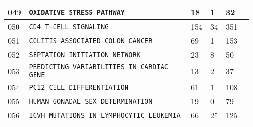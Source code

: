 \documentclass{article}
\begin{document}
\begin{center}
\begin{tabular}{ | C{16pt} | C{149pt} | C{25pt} | C{25pt} | C{25pt} | C{36pt} | }
		 & \texttt{OXIDATIVE STRESS PATHWAY} & 18 & 1 & 32 & \cite{bbm-049} \\
		 & \texttt{CD4 T-CELL SIGNALING} & 154 & 34 & 351 & \cite{bbm-050} \\
		 & \texttt{COLITIS ASSOCIATED COLON~CANCER} & 69 & 1 & 153 & \cite{bbm-051} \\
		 & \texttt{SEPTATION INITIATION NETWORK} & 23 & 8 & 50 & \cite{bbm-052} \\
		 & \texttt{PREDICTING VARIABILITIES IN~CARDIAC GENE} & 13 & 2 & 37 & \cite{bbm-053} \\ 
		 & \texttt{PC12 CELL DIFFERENTIATION} & 61 & 1 & 108 & \cite{bbm-054} \\
		 & \texttt{HUMAN GONADAL SEX DETERMINATION} & 19 & 0 & 79 & \cite{bbm-055} \\
		 & \texttt{IGVH MUTATIONS IN~LYMPHOCYTIC LEUKEMIA} & 66 & 25 & 125 & \cite{bbm-056} \\
		\hline
	\end{tabular}


\end{center}
\end{document}
